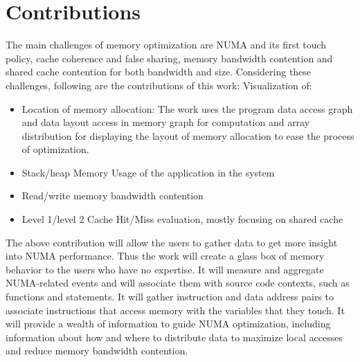 \section{Contributions}
The main challenges of memory optimization are NUMA and its first touch policy, cache coherence and false sharing, memory bandwidth contention and shared cache contention for both bandwidth and size. Considering these challenges, following are the contributions of this work: \newline
Visualization of: 
\begin{itemize}
  \item Location of memory allocation: The work uses the program data access graph and data layout access in memory graph for computation and array distribution for displaying the layout of memory allocation to ease the process of optimization. 
  \item Stack/heap Memory Usage of the application in the system 
  \item Read/write memory bandwidth contention
  \item Level 1/level 2 Cache Hit/Miss evaluation, mostly focusing on shared cache	
\end{itemize}
The above contribution will allow the users to gather data to get more insight into NUMA performance. Thus the work will create a glass box of memory behavior to the users who have no expertise. It will measure and aggregate NUMA-related events and will associate them with source code contexts, such as functions and statements. It will gather instruction and data address pairs to associate instructions that access memory with the variables that they touch. It will provide a wealth of information to guide NUMA optimization, including information about how and where to distribute data to maximize local accesses and reduce memory bandwidth contention.